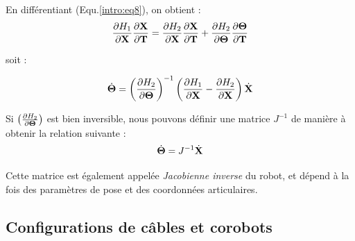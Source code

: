 En différentiant (Equ.\ref{intro:eq8}), on obtient :
\begin{equation}
\frac{\partial H_1}{\partial {\bf X}} \frac{\partial {\bf X}}{\partial {\bf T}} =  \frac{\partial H_2}{\partial {\bf X}} \frac{\partial {\bf X}}{\partial {\bf T}} + \frac{\partial H_2}{\partial {\bf \Theta}} \frac{\partial {\bf \Theta}}{\partial {\bf T}}
\label{intro:eq9}
\end{equation}

soit :

\begin{equation}
\dot {\bf \Theta} = \left ( \frac{\partial H_2}{\partial {\bf \Theta}} \right )^{-1} \left (\frac{\partial H_1}{\partial {\bf X}} - \frac{\partial H_2}{\partial {\bf X}} \right ) \dot {\bf X}
\label{intro:eq10}
\end{equation}

Si $\left ( \frac{\partial H_2}{\partial {\bf \Theta}} \right )$ est bien inversible, nous pouvons définir une matrice $J^{-1}$ de manière à obtenir la relation suivante :
\begin{equation}
\dot {\bf \Theta} = J^{-1} \dot {\bf X}
\label{intro:eq11}
\end{equation}

Cette matrice est également appelée {\it Jacobienne inverse} du robot, et dépend à la fois des paramètres de pose et des coordonnées articulaires.


\subsection{Configurations de câbles et corobots}

